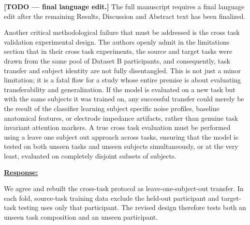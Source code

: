 \documentclass{article}
\begin{document}
\textbf{[TODO --- final language edit.]}
The full manuscript requires a final language edit after the remaining Results,
Discussion and Abstract text has been finalized.

\vspace{0.3cm}


\begin{cmt}{}{}

Another critical methodological failure that must be addressed is the cross task
validation experimental design. The authors openly admit in the limitations
section that in their cross task experiments, the source and target tasks were
drawn from the same pool of Dataset B participants, and consequently, task
transfer and subject identity are not fully disentangled. This is not just a
minor limitation; it is a fatal flaw for a study whose entire premise is about
evaluating transferability and generalization. If the model is evaluated on a
new task but with the same subjects it was trained on, any successful transfer
could merely be the result of the classifier learning subject specific noise
profiles, baseline anatomical features, or electrode impedance artifacts, rather
than genuine task invariant attention markers. A true cross task evaluation must
be performed using a leave one subject out approach across tasks, ensuring that
the model is tested on both unseen tasks and unseen subjects simultaneously, or
at the very least, evaluated on completely disjoint subsets of subjects.

\end{cmt}
\vspace{0.1cm}
\noindent
\underline{\textbf{Response:}}
\vspace{0.2cm}

We agree and rebuilt the cross-task protocol as leave-one-subject-out transfer.
In each fold, source-task training data exclude the held-out participant and
target-task testing uses only that participant. The revised design therefore
tests both an unseen task composition and an unseen participant.

\vspace{0.3cm}
\end{document}
